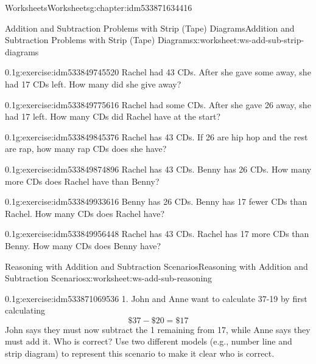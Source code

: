 \documentclass[twoside,11pt,]{book}
\begin{document}
\begin{chapterptx}{Worksheets}{}{Worksheets}{}{}{g:chapter:idm533871634416}
\begin{worksheet-section-numberless}{Addition and Subtraction Problems with Strip (Tape) Diagrams}{}{Addition and Subtraction Problems with Strip (Tape) Diagrams}{}{}{x:worksheet:ws-add-sub-strip-diagrams}
\begin{divisionexercise}{2}{}{0.1}{g:exercise:idm533849745520}
Rachel had 43 CDs.  After she gave some away, she had 17 CDs left.  How many did she give away?%
\end{divisionexercise}%
\begin{divisionexercise}{3}{}{0.1}{g:exercise:idm533849775616}%
Rachel had some CDs.  After she gave 26 away, she had 17 left.  How many CDs did Rachel have at the start?%
\end{divisionexercise}%
\begin{divisionexercise}{4}{}{0.1}{g:exercise:idm533849845376}%
Rachel has 43 CDs.  If 26 are hip hop and the rest are rap, how many rap CDs does she have?%
\end{divisionexercise}%
\begin{divisionexercise}{5}{}{0.1}{g:exercise:idm533849874896}%
Rachel has 43 CDs.  Benny has 26 CDs.  How many more CDs does Rachel have than Benny?%
\end{divisionexercise}%
\begin{divisionexercise}{6}{}{0.1}{g:exercise:idm533849933616}%
Benny has 26 CDs. Benny has 17 fewer CDs than Rachel.  How many CDs does Rachel have?%
\end{divisionexercise}%
\begin{divisionexercise}{7}{}{0.1}{g:exercise:idm533849956448}%
Rachel has 43 CDs. Rachel has 17 more CDs than Benny.  How many CDs does Benny have?%
\end{divisionexercise}%
\end{worksheet-section-numberless}
\restoregeometry
%
%
\typeout{************************************************}
\typeout{************************************************}
%
\begin{worksheet-section-numberless}{Reasoning with Addition and Subtraction Scenarios}{}{Reasoning with Addition and Subtraction Scenarios}{}{}{x:worksheet:ws-add-sub-reasoning}
\begin{divisionexercise}{1}{}{0.1}{g:exercise:idm533871069536}%
1.	John and Anne want to calculate \textdollar{}37-\textdollar{}19 by first calculating%
\begin{equation*}
\$37-\$20=\$17 
\end{equation*}
John says they must now subtract the \textdollar{}1 remaining from \textdollar{}17, while Anne says they must add it.  Who is correct?  Use two different models (e.g., number line and strip diagram) to represent this scenario to make it clear who is correct.%

\end{divisionexercise}
\end{worksheet-section-numberless}
\end{chapterptx}
\end{document}
